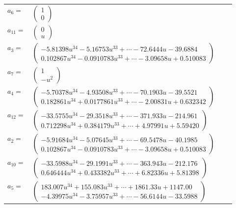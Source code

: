 \documentclass[1p]{elsarticle_modified}
\theoremstyle{definition}
\begin{document}
\begin{tabular}{m{7pt} m{180pt} m{7pt} m{180pt} }
\flushright $a_{6}=$&$\begin{pmatrix}1\\0\end{pmatrix}$ \\
\flushright $a_{11}=$&$\begin{pmatrix}0\\u\end{pmatrix}$ \\
\flushright $a_{3}=$&$\begin{pmatrix}-5.81398 u^{34}-5.16753 u^{33}+\cdots-72.6444 u-39.6884\\0.102867 u^{34}-0.0910783 u^{33}+\cdots-3.09658 u+0.510083\end{pmatrix}$ \\
\flushright $a_{7}=$&$\begin{pmatrix}1\\- u^2\end{pmatrix}$ \\
\flushright $a_{4}=$&$\begin{pmatrix}-5.70378 u^{34}-4.93508 u^{33}+\cdots-70.1903 u-39.5521\\0.182861 u^{34}+0.0177861 u^{33}+\cdots-2.00831 u+0.632342\end{pmatrix}$ \\
\flushright $a_{12}=$&$\begin{pmatrix}-33.5755 u^{34}-29.3518 u^{33}+\cdots-371.933 u-214.961\\0.712298 u^{34}+0.384179 u^{33}+\cdots+4.97991 u+5.59420\end{pmatrix}$ \\
\flushright $a_{2}=$&$\begin{pmatrix}-5.91684 u^{34}-5.07645 u^{33}+\cdots-69.5478 u-40.1985\\0.102867 u^{34}-0.0910783 u^{33}+\cdots-3.09658 u+0.510083\end{pmatrix}$ \\
\flushright $a_{10}=$&$\begin{pmatrix}-33.5988 u^{34}-29.1991 u^{33}+\cdots-363.943 u-212.176\\0.646444 u^{34}+0.433382 u^{33}+\cdots+6.82336 u+5.81398\end{pmatrix}$ \\
\flushright $a_{5}=$&$\begin{pmatrix}183.007 u^{34}+155.083 u^{33}+\cdots+1861.33 u+1147.00\\-4.39975 u^{34}-3.75957 u^{33}+\cdots-56.6144 u-33.5988\end{pmatrix}$ \\

\end{tabular}
\end{document}
